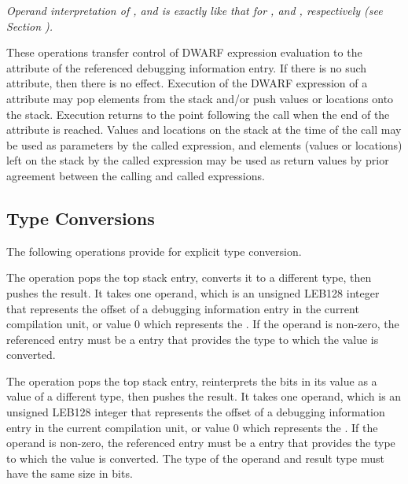 \begin{enumerate}[1. ]
\textit{Operand interpretation of
\DWOPcalltwo, \DWOPcallfour{} and \DWOPcallref{} is exactly like
that for \DWFORMreftwo, \DWFORMreffour{} and \DWFORMrefaddr,
respectively
(see Section  ).}

These operations transfer control of DWARF expression evaluation to
 the \DWATlocation{} attribute of the
referenced debugging information entry. If there is no such attribute,
then there is no effect. Execution of the DWARF expression of
 a \DWATlocation{} attribute may pop
elements from the stack and/or push values or locations onto the
stack. Execution returns to the point following the call when the end
of the attribute is reached. Values and locations on the stack at the
time of the call may be used as parameters by the called expression,
and elements (values or locations) left on the stack by the called
expression may be used as return values by prior agreement between the
calling and called expressions.
\end{enumerate}

\subsection{Type Conversions}
\label{chap:typeconversions}
The following operations provide for explicit type conversion.

\begin{enumerate}[1. ]
\itembfnl{\DWOPconvertTARG}
The \DWOPconvertNAME{} operation pops the top stack entry, converts it to a
different type, then pushes the result. It takes one operand, which is an
unsigned LEB128 integer that represents the offset of a debugging
information entry in the current compilation unit, or value 0 which
represents the \generictype. If the operand is non-zero, the
referenced entry must be a \DWTAGbasetype{} entry that provides the type
to which the value is converted.

\itembfnl{\DWOPreinterpretTARG}
The \DWOPreinterpretNAME{} operation pops the top stack entry, reinterprets
the bits in its value as a value of a different type, then pushes the
result. It takes one operand, which is an unsigned LEB128 integer that
represents the offset of a debugging information entry in the current
compilation unit, or value 0 which represents the \generictype.
If the operand is non-zero, the referenced entry must be a
\DWTAGbasetype{} entry that provides the type to which the value is converted.
The type of the operand and result type must have the same size in bits.

\end{enumerate}

